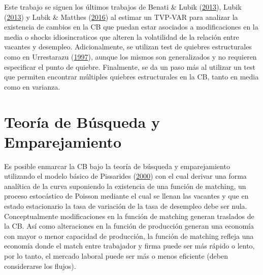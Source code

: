 \documentclass[12pt,oneside]{reedthesis}
\begin{document}
Este trabajo se siguen los últimos trabajos de Benati \& Lubik (\protect\hyperlink{ref-Benati2013}{2013}), Lubik (\protect\hyperlink{ref-Lubik2013}{2013}) y Lubik \& Matthes (\protect\hyperlink{ref-Lubik2016}{2016}) al estimar un TVP-VAR para analizar la existencia de cambios en la CB que puedan estar asociados a modificaciones en la media o shocks idiosincraticos que alteren la volatilidad de la relación entre vacantes y desempleo. Adicionalmente, se utilizan test de quiebres estructurales como en Urrestarazu (\protect\hyperlink{ref-Urrestarazu1997}{1997}), aunque los mismos son generalizados y no requieren especificar el punto de quiebre. Finalmente, se da un paso más al utilizar un test que permiten encontrar múltiples quiebres estructurales en la CB, tanto en media como en varianza.

\hypertarget{teoruxeda-de-buxfasqueda-y-emparejamiento}{%
\section{Teoría de Búsqueda y Emparejamiento}\label{teoruxeda-de-buxfasqueda-y-emparejamiento}}

Es posible enmarcar la CB bajo la teoría de búsqueda y emparejamiento utilizando el modelo básico de Pissarides (\protect\hyperlink{ref-Pissarides2000}{2000}) con el cual derivar una forma analítica de la curva suponiendo la existencia de una función de matching, un proceso estocástico de Poisson mediante el cual se llenan las vacantes y que en estado estacionario la tasa de variación de la tasa de desempleo debe ser nula. Conceptualmente modificaciones en la función de matching generan traslados de la CB. Así como alteraciones en la función de producción generan una economía con mayor o menor capacidad de producción, la función de matching refleja una economía donde el match entre trabajador y firma puede ser más rápido o lento, por lo tanto, el mercado laboral puede ser más o menos eficiente (deben considerarse los flujos).
\end{document}
